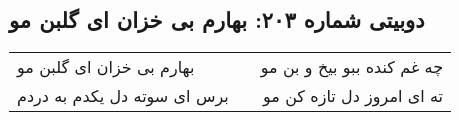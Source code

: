 \begin{center}
\section*{دوبیتی شماره ۲۰۳: بهارم بی خزان ای گلبن مو}
\label{sec:203}
\begin{longtable}{l p{0.5cm} r}
بهارم بی خزان ای گلبن مو
&&
چه غم کنده ببو بیخ و بن مو
\\
برس ای سوته دل یکدم به دردم
&&
ته ای امروز دل تازه کن مو
\\
\end{longtable}
\end{center}
